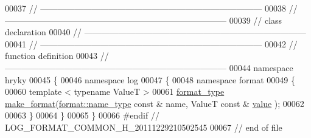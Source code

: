 \begin{DoxyCode}
00037 \textcolor{comment}{//
      ------------------------------------------------------------------------------}
00038 \textcolor{comment}{//
      ------------------------------------------------------------------------------}
00039 \textcolor{comment}{// class declaration}
00040 \textcolor{comment}{//
      ------------------------------------------------------------------------------}
00041 \textcolor{comment}{//
      ------------------------------------------------------------------------------}
00042 \textcolor{comment}{// function definition}
00043 \textcolor{comment}{//
      ------------------------------------------------------------------------------}
00044 \textcolor{keyword}{namespace }hryky
00045 \{
00046 \textcolor{keyword}{namespace }log
00047 \{
00048 \textcolor{keyword}{namespace }format
00049 \{
00060     \textcolor{keyword}{template} < \textcolor{keyword}{typename} ValueT >
00061     \hyperlink{namespacehryky_1_1log_ad50448c3f934f1eacd5c1bcffe8111e1}{format_type} \hyperlink{namespacehryky_1_1log_1_1format_ae8ca636c4b89fe300287aca4f870f2ef}{make_format}(\hyperlink{namespacehryky_1_1log_1_1format_ab7408d1e2ed2d648dbf9bba69eb74288}{format::name_type} \textcolor{keyword}{const} & name, ValueT \textcolor{keyword}{const} & \hyperlink{namespacehryky_1_1log_1_1format_a5b9af9c1a7b018d54144acfb1b8cc960}{value}
      );
00062 
00063 \}
00064 \}
00065 \}
00066 \textcolor{preprocessor}{#endif // LOG\_FORMAT\_COMMON\_H\_20111229210502545}
00067 \textcolor{preprocessor}{}\textcolor{comment}{// end of file}
\end{DoxyCode}
